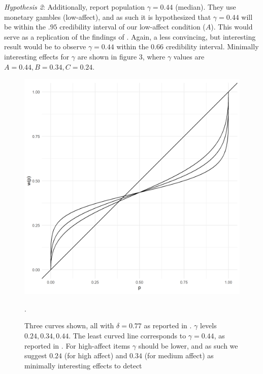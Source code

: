\documentclass[12pt]{article}
\begin{document}
\emph{Hypothesis 2}: Additionally,
\textcite{gonzalez1999shape} report
population $\gamma = 0.44$ (median).
They use monetary gambles (low-affect),
and as such it is hypothesized that
$\gamma = 0.44$ will be within the  $.95$
credibility interval of our low-affect
condition ($A$). This would serve as
a replication of the findings of
\textcite{gonzalez1999shape}. Again, a
less convincing, but interesting result would
be to observe $\gamma = 0.44$ within the
 $0.66$ credibility interval. Minimally
interesting effects for $\gamma$ are
shown in figure 3, where  $\gamma$
values are  $A = 0.44, B = 0.34, C = 0.24$.

\begin{figure}[H]
	\includegraphics[width = \linewidth]{../Figures/ourHyp.png}
	\caption{Three curves shown, all with $\delta = 0.77$
	as reported in \textcite{gonzalez1999shape}.
	$\gamma$ levels $0.24, 0.34, 0.44$. The
	least curved line corresponds to $\gamma = 0.44$,
	as reported in \textcite{gonzalez1999shape}.
	For high-affect items $\gamma$ should
	be lower, and as such we suggest $0.24$
	(for high affect) and  $0.34$ (for medium
	affect) as minimally interesting effects
to detect}.
\end{figure}
\end{document}
